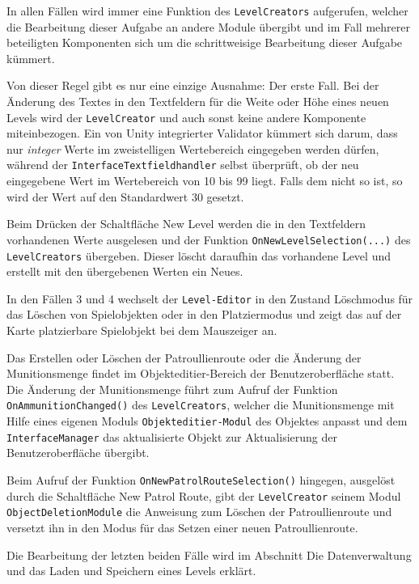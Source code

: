 In allen Fällen wird immer eine Funktion des \texttt{LevelCreators} aufgerufen, welcher die Bearbeitung dieser Aufgabe an andere Module übergibt und im Fall mehrerer beteiligten Komponenten sich um die schrittweisige Bearbeitung dieser Aufgabe kümmert.

Von dieser Regel gibt es nur eine einzige Ausnahme: Der erste Fall. Bei der Änderung des Textes in den Textfeldern für die Weite oder Höhe eines neuen Levels wird der \texttt{LevelCreator} und auch sonst keine andere Komponente miteinbezogen. Ein von Unity integrierter Validator kümmert sich darum, dass nur \textit{integer} Werte im zweistelligen Wertebereich eingegeben werden dürfen, während der \texttt{InterfaceTextfieldhandler} selbst überprüft, ob der neu eingegebene Wert im Wertebereich von 10 bis 99 liegt. Falls dem nicht so ist, so wird der Wert auf den Standardwert 30 gesetzt.

Beim Drücken der Schaltfläche \glqq{}New Level\grqq{} werden die in den Textfeldern vorhandenen Werte ausgelesen und der Funktion \texttt{OnNewLevelSelection(...)} des \texttt{LevelCreators} übergeben. Dieser löscht daraufhin das vorhandene Level und erstellt mit den übergebenen Werten ein Neues.

In den Fällen 3 und 4 wechselt der \texttt{Level-Editor} in den Zustand Löschmodus für das Löschen von Spielobjekten oder in den Platziermodus und zeigt das auf der Karte platzierbare Spielobjekt bei dem Mauszeiger an.

Das Erstellen oder Löschen der Patroullienroute oder die Änderung der Munitionsmenge findet im Objekteditier-Bereich der Benutzeroberfläche statt.  
Die Änderung der Munitionsmenge führt zum Aufruf der Funktion \texttt{OnAmmunitionChanged()} des \texttt{LevelCreators}, welcher die Munitionsmenge mit Hilfe eines eigenen Moduls \texttt{Objekteditier-Modul} des Objektes anpasst und dem \texttt{InterfaceManager} das aktualisierte Objekt zur Aktualisierung der Benutzeroberfläche übergibt.

Beim Aufruf der Funktion \texttt{OnNewPatrolRouteSelection()} hingegen, ausgelöst durch die Schaltfläche \glqq{}New Patrol Route\grqq{}, gibt der \texttt{LevelCreator} seinem Modul \texttt{ObjectDeletionModule} die Anweisung zum Löschen der Patroullienroute und versetzt ihn in den Modus für das Setzen einer neuen Patroullienroute. 

Die Bearbeitung der letzten beiden Fälle wird im Abschnitt \glqq{}Die Datenverwaltung und das Laden und Speichern eines Levels\grqq{} erklärt.

